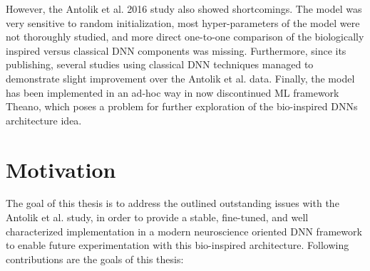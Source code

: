However, the Antolik et al. 2016 study also showed shortcomings. The model was very sensitive to random initialization, most hyper-parameters of the model were not thoroughly studied, and more direct one-to-one comparison of the biologically inspired versus classical DNN components was missing. Furthermore, since its publishing, several studies using classical DNN techniques managed to demonstrate slight improvement over the Antolik et al. data. Finally, the model has been implemented in an ad-hoc way in now discontinued ML framework Theano, which poses a problem for further exploration of the bio-inspired DNNs architecture idea.

\section*{Motivation}
The goal of this thesis is to address the outlined outstanding issues with the Antolik et al. study, in order to provide a stable, fine-tuned, and well characterized implementation in a modern neuroscience oriented DNN framework to enable future experimentation with this bio-inspired architecture. Following contributions are the goals of this thesis:


